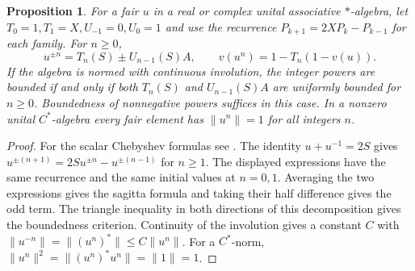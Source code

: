 \documentclass[11pt,reqno]{amsart}
\newtheorem{proposition}[theorem]{Proposition}
\theoremstyle{definition}
\theoremstyle{remark}
\numberwithin{equation}{section}
\begin{document}
\begin{proposition}\label{m1:chebyshev}
For a fair \(u\) in a real or complex unital associative \(*\)-algebra,
let \(T_0=1,T_1=X,U_{-1}=0,U_0=1\) and use the recurrence
\(P_{k+1}=2XP_k-P_{k-1}\) for each family. For \(n\ge0\),
\begin{equation}\label{m1:cheb-eq}
 u^{\pm n}=T_n(S)\pm U_{n-1}(S)A,\qquad
 v(u^n)=1-T_n(1-v(u)).
\end{equation}
If the algebra is normed with continuous involution, the integer powers
are bounded if and only if both \(T_n(S)\) and \(U_{n-1}(S)A\) are
uniformly bounded for \(n\ge0\). Boundedness of nonnegative powers
suffices in this case. In a nonzero unital \(C^*\)-algebra every fair
element has \(\|u^n\|=1\) for all integers \(n\).
\end{proposition}
\begin{proof}
For the scalar Chebyshev formulas see \cite[\S18.5(i)]{m1:DLMF}.
The identity \(u+u^{-1}=2S\) gives
\(u^{\pm(n+1)}=2Su^{\pm n}-u^{\pm(n-1)}\) for \(n\ge1\).
The displayed expressions have the same recurrence and the same
initial values at \(n=0,1\). Averaging the two expressions gives the
sagitta formula and taking their half difference gives the odd term.
The triangle inequality in both directions of this decomposition gives
the boundedness criterion. Continuity of the involution gives a
constant \(C\) with \(\|u^{-n}\|=\|(u^n)^*\|\le C\|u^n\|\).
For a \(C^*\)-norm, \(\|u^n\|^2=\|(u^n)^*u^n\|=\|1\|=1\).
\end{proof}
\end{document}
